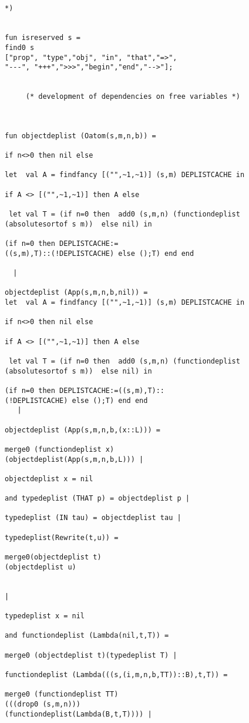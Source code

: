 \documentclass[12pt]{article}
\begin{document}
\begin{verbatim}


*)


fun isreserved s = 
find0 s 
["prop", "type","obj", "in", "that","=>",
"---", "+++",">>>","begin","end","-->"];		


     (* development of dependencies on free variables *)



fun objectdeplist (Oatom(s,m,n,b)) =

if n<>0 then nil else 

let  val A = findfancy [("",~1,~1)] (s,m) DEPLISTCACHE in

if A <> [("",~1,~1)] then A else

 let val T = (if n=0 then  add0 (s,m,n) (functiondeplist 
(absolutesortof s m))  else nil) in

(if n=0 then DEPLISTCACHE:=
((s,m),T)::(!DEPLISTCACHE) else ();T) end end

  |

objectdeplist (App(s,m,n,b,nil)) =
let  val A = findfancy [("",~1,~1)] (s,m) DEPLISTCACHE in

if n<>0 then nil else

if A <> [("",~1,~1)] then A else

 let val T = (if n=0 then  add0 (s,m,n) (functiondeplist 
(absolutesortof s m))  else nil) in

(if n=0 then DEPLISTCACHE:=((s,m),T)::
(!DEPLISTCACHE) else ();T) end end
   |

objectdeplist (App(s,m,n,b,(x::L))) =

merge0 (functiondeplist x)
(objectdeplist(App(s,m,n,b,L))) |

objectdeplist x = nil 

and typedeplist (THAT p) = objectdeplist p |

typedeplist (IN tau) = objectdeplist tau |

typedeplist(Rewrite(t,u)) =

merge0(objectdeplist t)
(objectdeplist u)


|

typedeplist x = nil

and functiondeplist (Lambda(nil,t,T)) =

merge0 (objectdeplist t)(typedeplist T) |

functiondeplist (Lambda(((s,(i,m,n,b,TT))::B),t,T)) =

merge0 (functiondeplist TT)
(((drop0 (s,m,n)))
(functiondeplist(Lambda(B,t,T)))) |


\end{verbatim}
\end{document}
